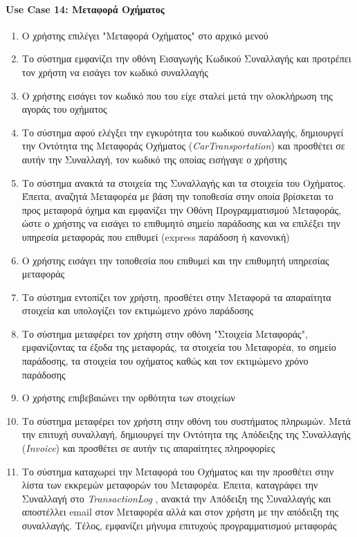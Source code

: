 \documentclass{../ol-softwaremanual}
\begin{document}
	\paragraph{\en Use Case 14: \gr Μεταφορά Οχήματος}  
	\begin{enumerate}
		\item Ο χρήστης επιλέγει \en"\gr Μεταφορά Οχήματος\en" \gr στο αρχικό μενού
		\item Το σύστημα εμφανίζει την οθόνη Εισαγωγής Κωδικού Συναλλαγής και προτρέπει τον χρήστη να εισάγει τον κωδικό συναλλαγής
		\item Ο χρήστης εισάγει τον κωδικό που του είχε σταλεί μετά την ολοκλήρωση της αγοράς του οχήματος
		\item Το σύστημα αφού ελέγξει την εγκυρότητα του κωδικού συναλλαγής, δημιουργεί την Οντότητα της Μεταφοράς Οχήματος (\en\textit{CarTransportation}\gr) και προσθέτει σε αυτήν την Συναλλαγή, τον κωδικό της οποίας εισήγαγε ο χρήστης
		\item Το σύστημα ανακτά τα στοιχεία της Συναλλαγής και τα στοιχεία του Οχήματος. Έπειτα, αναζητά Μεταφορέα με βάση την τοποθεσία στην οποία βρίσκεται το προς μεταφορά όχημα και εμφανίζει την Οθόνη Προγραμματισμού Μεταφοράς, ώστε ο χρήστης να εισάγει το επιθυμητό σημείο παράδοσης και να επιλέξει την υπηρεσία μεταφοράς που επιθυμεί (\en express \gr παράδοση ή κανονική)		
		\item Ο χρήστης εισάγει την τοποθεσία που επιθυμεί και την επιθυμητή υπηρεσίας μεταφοράς
		\item Το σύστημα εντοπίζει τον χρήστη, προσθέτει στην Μεταφορά τα απαραίτητα στοιχεία και υπολογίζει τον εκτιμώμενο χρόνο παράδοσης
		\item Το σύστημα μεταφέρει τον χρήστη στην οθόνη \en"\gr Στοιχεία Μεταφοράς\en"\gr, εμφανίζοντας τα έξοδα της μεταφοράς, τα στοιχεία του Μεταφορέα, το σημείο παράδοσης, τα στοιχεία του οχήματος καθώς και τον εκτιμώμενο χρόνο παράδοσης 
		\item Ο χρήστης επιβεβαιώνει την ορθότητα των στοιχείων 				
		\item Το σύστημα μεταφέρει τον χρήστη στην οθόνη του συστήματος πληρωμών. Μετά την επιτυχή συναλλαγή, δημιουργεί την Οντότητα της Απόδειξης της Συναλλαγής (\en \textit{Invoice}\gr) και προσθέτει σε αυτήν τις απαραίτητες πληροφορίες  
		\item Το σύστημα καταχωρεί την Μεταφορά του Οχήματος και την προσθέτει στην λίστα των εκκρεμών μεταφορών του Μεταφορέα. Έπειτα, καταγράφει την Συναλλαγή στο \en \textit{TransactionLog} \gr, ανακτά την Απόδειξη της Συναλλαγής και αποστέλλει \en email \gr στον Μεταφορέα αλλά και στον χρήστη με την απόδειξη της συναλλαγής. Τέλος, εμφανίζει μήνυμα επιτυχούς προγραμματισμού μεταφοράς
	\end{enumerate}
	
\end{document}
